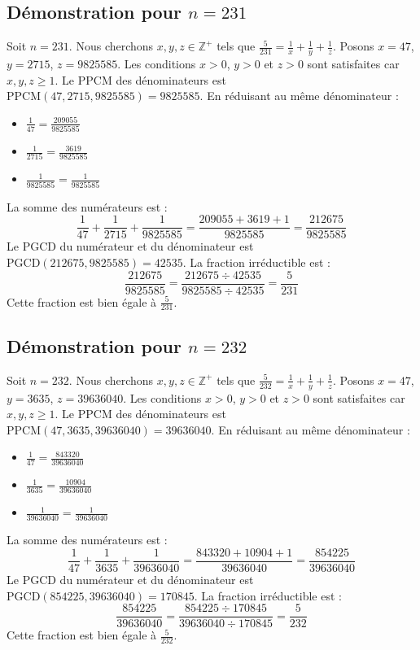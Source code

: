 \documentclass[11pt,a4paper]{article}
\begin{document}
\subsection{Démonstration pour $n = 231$}
Soit $n = 231$. Nous cherchons $x, y, z \in \mathbb{Z}^{+}$ tels que $\frac{5}{231} = \frac{1}{x} + \frac{1}{y} + \frac{1}{z}$.
Posons $x = 47$, $y = 2715$, $z = 9825585$.
Les conditions $x > 0$, $y > 0$ et $z > 0$ sont satisfaites car $x, y, z \geq 1$.
Le PPCM des dénominateurs est $\text{PPCM}(47, 2715, 9825585) = 9825585$.
En réduisant au même dénominateur :
\begin{itemize}
    \item $\frac{1}{47} = \frac{209055}{9825585}$
    \item $\frac{1}{2715} = \frac{3619}{9825585}$
    \item $\frac{1}{9825585} = \frac{1}{9825585}$
\end{itemize}
La somme des numérateurs est :
$$ \frac{1}{47} + \frac{1}{2715} + \frac{1}{9825585} = \frac{209055 + 3619 + 1}{9825585} = \frac{212675}{9825585} $$
Le PGCD du numérateur et du dénominateur est $\text{PGCD}(212675, 9825585) = 42535$.
La fraction irréductible est :
$$ \frac{212675}{9825585} = \frac{212675 \div 42535}{9825585 \div 42535} = \frac{5}{231} $$
Cette fraction est bien égale à $\frac{5}{231}$.

\subsection{Démonstration pour $n = 232$}
Soit $n = 232$. Nous cherchons $x, y, z \in \mathbb{Z}^{+}$ tels que $\frac{5}{232} = \frac{1}{x} + \frac{1}{y} + \frac{1}{z}$.
Posons $x = 47$, $y = 3635$, $z = 39636040$.
Les conditions $x > 0$, $y > 0$ et $z > 0$ sont satisfaites car $x, y, z \geq 1$.
Le PPCM des dénominateurs est $\text{PPCM}(47, 3635, 39636040) = 39636040$.
En réduisant au même dénominateur :
\begin{itemize}
    \item $\frac{1}{47} = \frac{843320}{39636040}$
    \item $\frac{1}{3635} = \frac{10904}{39636040}$
    \item $\frac{1}{39636040} = \frac{1}{39636040}$
\end{itemize}
La somme des numérateurs est :
$$ \frac{1}{47} + \frac{1}{3635} + \frac{1}{39636040} = \frac{843320 + 10904 + 1}{39636040} = \frac{854225}{39636040} $$
Le PGCD du numérateur et du dénominateur est $\text{PGCD}(854225, 39636040) = 170845$.
La fraction irréductible est :
$$ \frac{854225}{39636040} = \frac{854225 \div 170845}{39636040 \div 170845} = \frac{5}{232} $$
Cette fraction est bien égale à $\frac{5}{232}$.
\end{document}
